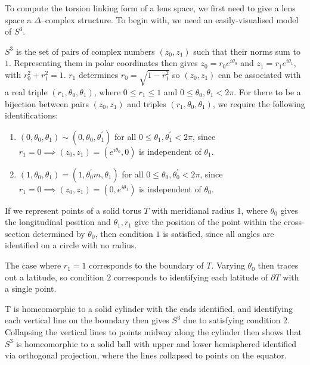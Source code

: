 \documentclass{article}
\begin{document}
To compute the torsion linking form of a lens space, we first need to give a lens space a $\Delta$--complex structure. To begin with, we need an easily-visualised model of $S^3$.

$S^3$ is the set of pairs of complex numbers $(z_0,z_1)$ such that their norms sum to $1$. Representing them in polar coordinates then gives $z_0=r_0e^{i\theta_0}$ and $z_1=r_1e^{i\theta_1}$, with $r_0^2+r_1^2=1$. $r_1$ determines $r_0=\sqrt{1-r_1^2}$ so $(z_0,z_1)$ can be associated with a real triple $(r_1,\theta_0,\theta_1)$, where $0\leq r_1\leq 1$ and $0\leq\theta_0,\theta_1<2\pi$.
For there to be a bijection between pairs $(z_0,z_1)$ and triples $(r_1,\theta_0,\theta_1)$, we require the following identifications:
\begin{enumerate}
\item $(0,\theta_0,\theta_1)\sim(0,\theta_0,\theta_1^{'})$ for all $0\leq\theta_1,\theta_1^{'}<2\pi$, since $r_1=0\implies (z_0,z_1)=(e^{i\theta_0},0)$ is independent of $\theta_1$.
\item $(1,\theta_0,\theta_1)=(1,\theta_0^{'}m,\theta_1)$ for all $0\leq\theta_0,\theta_0^{'}<2\pi$, since $r_1=0\implies (z_0,z_1)=(0,e^{i\theta_1})$ is independent of $\theta_0$.
\end{enumerate}

If we represent points of a solid torus $T$ with meridianal radius 1, where $\theta_0$ gives the longitudinal position and $\theta_1,r_1$ give the position of the point within the cross-section determined by $\theta_0$, then condition $1$ is satisfied, since all angles are identified on a circle with no radius.

The case where $r_1=1$ corresponds to the boundary of $T$. Varying $\theta_0$ then traces out a latitude, so condition $2$ corresponds to identifying each latitude of $\partial T$ with a single point.

T is homeomorphic to a solid cylinder with the ends identified, and identifying each vertical line on the boundary then gives $S^3$ due to satisfying condition $2$. Collapsing the vertical lines to points midway along the cylinder then shows that $S^3$ is homeomorphic to a solid ball with upper and lower hemisphered identified via orthogonal projection, where the lines collapsed to points on the equator.\\
\end{document}
